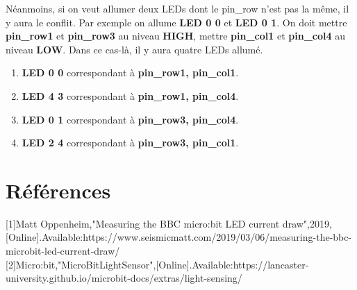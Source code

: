 \documentclass[14px]{article}
\begin{document}
Néanmoins, si on veut allumer deux LEDs dont le pin\_row n'est pas la même, il y aura le conflit. Par exemple on allume \textbf{LED 0 0} et \textbf{LED 0 1}. On doit mettre \textbf{pin\_row1} et \textbf{pin\_row3} au niveau \textbf{HIGH}, mettre \textbf{pin\_col1} et \textbf{pin\_col4} au niveau \textbf{LOW}. Dans ce cas-là, il y aura quatre LEDs allumé.
\begin{enumerate}
    \item \textbf{LED 0 0} correspondant à \textbf{pin\_row1, pin\_col1}.
    \item \textbf{LED 4 3} correspondant à \textbf{pin\_row1, pin\_col4}.
    \item \textbf{LED 0 1} correspondant à \textbf{pin\_row3, pin\_col4}.
    \item \textbf{LED 2 4} correspondant à \textbf{pin\_row3, pin\_col1}.
\end{enumerate}
\begin{figure}[htbp]
\end{figure}

\section{Références}
[1]Matt Oppenheim,"Measuring the BBC micro:bit LED current draw",2019,[Online].Available:https://www.seismicmatt.com/2019/03/06/measuring-the-bbc-microbit-led-current-draw/\\

[2]Micro:bit,"MicroBitLightSensor",[Online].Available:https://lancaster-university.github.io/microbit-docs/extras/light-sensing/\\
\end{document}
